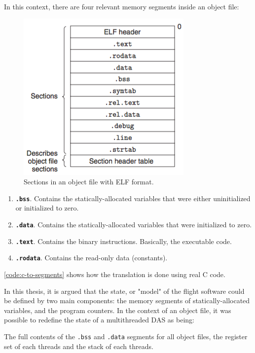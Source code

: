 {In this context, there are four relevant memory segments inside an object file:
\begin{figure}
	\centering 
	\includegraphics[width=.9\linewidth,keepaspectratio]{art/reloc-obj.png}
	\caption{Sections in an object file with ELF format.\cite{online:zhang}}
	\label{fig:sections-obj}
	\vspace{-24pt}
\end{figure}
\begin{enumerate}
	\item \textbf{\texttt{.bss}}. Contains the statically-allocated variables that were either uninitialized or initialized to zero.
	\item \textbf{\texttt{.data}}. Contains the statically-allocated variables that were initialized to zero.
	\item \textbf{\texttt{.text}}. Contains the binary instructions. Basically, the executable code.
	\item \textbf{\texttt{.rodata}}. Contains the read-only data (constants).
\end{enumerate}
\autoref{code:c-to-segments} shows how the translation is done using real C code.

In this thesis, it is argued that the state, or "model" of the flight software could be defined by two main components: the memory segments of statically-allocated variables, and the program counters. In the context of an object file, it was possible to redefine the state of a multithreaded DAS as being:
\begin{shadedquotation}
The full contents of the \texttt{.bss} and \texttt{.data} segments for all object files, the register set of each threads and the stack of each threads. 
\end{shadedquotation}

}
